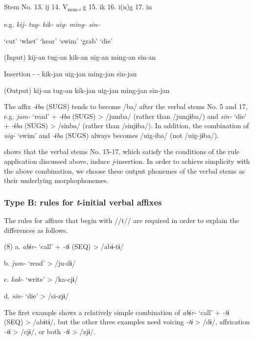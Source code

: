 Stem No.  13. ij  14. V\textsubscript{non-}\textit{\textsubscript{i}} g  15. ik  16. i(n)g    17. in

e.g.  \textit{kij-}  \textit{tug-}  \textit{kik-}  \textit{uig-}  \textit{ming-}  \textit{sin-}

  ‘cut’  ‘whet’  ‘hear’  ‘swim’  ‘grab’  ‘die’

(Input)  kij-an  tug-an  kik-an  uig-an  ming-an  sin-an

Insertion  {}-  {}-  kik-jan  uig-jan  ming-jan  sin-jan

(Output)  kij-an  tug-an  kik-jan  uig-jan  ming-jan  sin-jan

The affix \textit{{}-ɨba} (SUGS) tends to become /ba/ after the verbal stems No. 5 and 17, e.g. \textit{jum-} ‘read’ + \textit{{}-ɨba} (SUGS) > /jumba/ (rather than /jumjɨba/) and \textit{sin-} ‘die’ + \textit{{}-ɨba} (SUGS) > /sinba/ (rather than /sinjɨba/). In addition, the combination of \textit{uig-} ‘swim’ and \textit{{}-ɨba} (SUGS) always becomes /uig-iba/ (not /uig-jɨba/).

 shows that the verbal stems No. 15-17, which satisfy the conditions of the rule application discussed above, induce \textit{j}{}-insertion. In order to achieve simplicity with the above combination, we choose these output phonemes of the verbal stems as their underlying morphophonemes.

\subsubsection{Type B: rules for \textit{t}{}-initial verbal affixes}
\label{bkm:Ref347175824}
The rules for affixes that begin with //t// are required in order to explain the differences as follows.

(8)  a.  \textit{abɨr-}  ‘call’  +  \textit{{}-tɨ} (SEQ)  >  /abɨ-tɨ/

  b.  \textit{jum-}  ‘read’        >  /ju-dɨ/

  c.  \textit{kak-}  ‘write’        >  /ka-cjɨ/

  d.  \textit{sin-}  ‘die’        >  /si-zjɨ/

The first example shows a relatively simple combination of \textit{abɨr-} ‘call’ + \textit{{}-tɨ} (SEQ) > /abɨtɨ/, but the other three examples need voicing \textit{{}-tɨ} > /dɨ/, affrication \textit{{}-tɨ} > /cjɨ/, or both \textit{{}-tɨ} > /zjɨ/.

